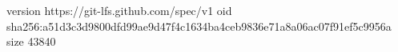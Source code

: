 version https://git-lfs.github.com/spec/v1
oid sha256:a51d3c3d9800dfd99ae9d47f4c1634ba4ceb9836e71a8a06ac07f91ef5c9956a
size 43840
